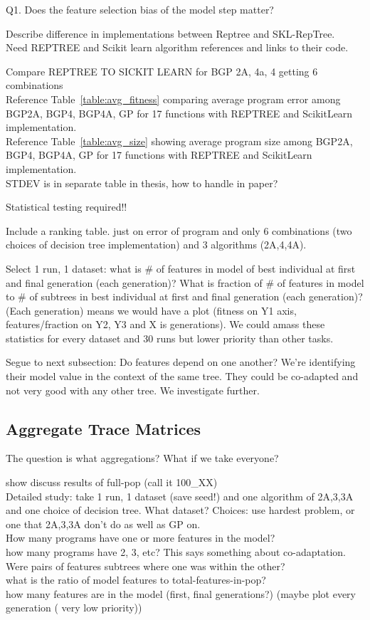Q1. Does the feature selection bias of the model step matter? 

Describe difference in implementations between Reptree and SKL-RepTree.\\
Need REPTREE and Scikit learn algorithm references and links to their code.

Compare REPTREE TO SICKIT LEARN for BGP 2A, 4a, 4 getting 6 combinations\\
Reference Table~\ref{table:avg_fitness} comparing average program error among BGP2A, BGP4, BGP4A, GP for 17 functions with REPTREE and ScikitLearn implementation.\\
Reference Table~\ref{table:avg_size} showing average program size among BGP2A, BGP4, BGP4A, GP for 17 functions with REPTREE and ScikitLearn implementation.\\
STDEV is in separate table in thesis, how to handle in paper?

Statistical testing required!!

Include a ranking table.  just on error of program and only 6 combinations (two choices of decision tree implementation) and 3 algorithms (2A,4,4A). 

Select 1 run, 1 dataset: what is \# of features in model of best individual at first and final generation (each generation)? What is fraction of \# of features in model to \# of subtrees in best individual at first and final generation (each generation)?  (Each generation) means we would have a plot (fitness on Y1 axis, features/fraction on Y2, Y3 and X is generations). We could amass these statistics for every dataset and 30 runs but lower priority than other tasks.

Segue to next subsection: Do features depend on one another? We're identifying their model value in the context of the same tree. They could be co-adapted and not very good with any other tree. We investigate further.

\subsection{Aggregate Trace Matrices}\label{sect:agg-features}

The question is what aggregations? What if we take everyone?

show discuss results of full-pop (call it 100\_XX)\\

Detailed study: take 1 run, 1 dataset (save seed!) and one algorithm of 2A,3,3A and one choice of decision tree.  What dataset? Choices: use hardest problem, or one that 2A,3,3A don't do as well as GP on. \\
How many programs have one or more features in the model?\\ how many programs have 2, 3, etc? This says something about co-adaptation. Were pairs of features subtrees where one was within the other?  \\what is the ratio of model features to total-features-in-pop? \\how many features are in the model (first, final generations?) (maybe plot every generation ( very low priority))

